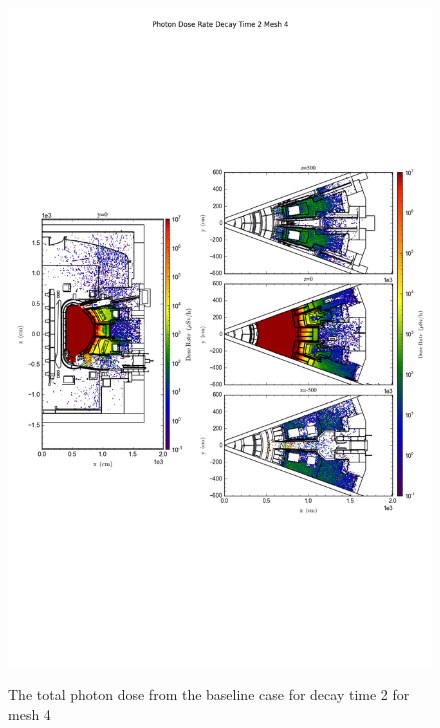 \begin{figure}[ht!]
\centering
\includegraphics[trim={0cm 9cm 0cm 10cm},clip,scale=0.75]{../plots/final_model/Photon_Dose_Rate_Decay_Time_2_Mesh_4.png}
\label{fig:photons_dc2_no4bc_m4_flux}
\caption{The total photon dose from the baseline case for decay time 2 for mesh 4}
\end{figure}
